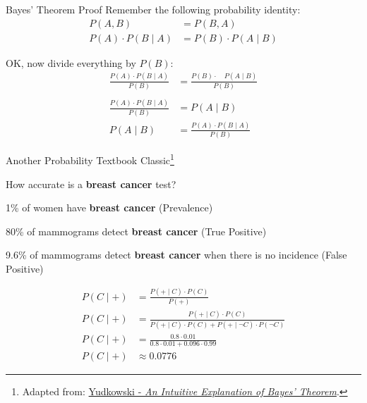 \begin{frame}{Bayes' Theorem Proof}
	Remember the following probability identity:
	$$
		\begin{aligned}
			P(A,B)                 & = P(B,A)                 \\
			P(A) \cdot P(B \mid A) & = P(B) \cdot P(A \mid B)
		\end{aligned}
	$$

	OK, now divide everything by $P(B)$:
	$$
		\begin{aligned}
			\frac{P(A) \cdot P(B \mid A)}{P(B)} & = \frac{P(B) \cdot \quad P(A \mid B)}{P(B)} \\
			                                    &                                             \\
			\frac{P(A) \cdot P(B \mid A)}{P(B)} & = P(A \mid B)                               \\
			P(A \mid B)                         & = \frac{P(A) \cdot P(B \mid A)}{P(B)}
		\end{aligned}
	$$
\end{frame}

\begin{frame}{Another Probability Textbook Classic\footnote{Adapted from: \href{https://www.yudkowsky.net/rational/bayes}{Yudkowski - \textit{An Intuitive Explanation of Bayes’ Theorem}}.}}
	\begin{example}
		\small
		How accurate is a \textbf{breast cancer} test?
		\begin{vfilleditems}
			\item \footnotesize 1\% of women have \textbf{breast cancer} (Prevalence)
			\item \footnotesize 80\% of mammograms detect \textbf{breast cancer} (True Positive)
			\item \footnotesize 9.6\% of mammograms detect \textbf{breast cancer} when there is no incidence (False Positive)
		\end{vfilleditems}
		$$
			\begin{aligned}
				P(C \mid +) & = \frac{P(+ \mid C) \cdot P(C)}{P(+)}                                                      \\
				P(C \mid +) & = \frac{P(+ \mid C) \cdot P(C)}{P(+ \mid C) \cdot P(C) + P(+ \mid \neg C) \cdot P(\neg C)} \\
				P(C \mid +) & = \frac{0.8 \cdot 0.01}{0.8 \cdot 0.01 + 0.096 \cdot 0.99}                                 \\
				P(C \mid +) & \approx 0.0776
			\end{aligned}
		$$
	\end{example}
\end{frame}


